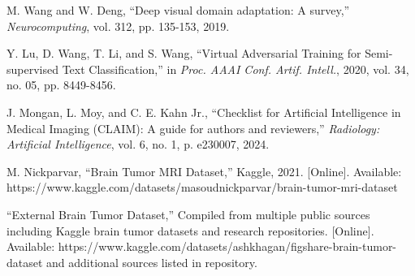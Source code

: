 \documentclass[conference]{IEEEtran}
\begin{document}
\begin{thebibliography}{1}
M. Wang and W. Deng, ``Deep visual domain adaptation: A survey,'' \textit{Neurocomputing}, vol. 312, pp. 135-153, 2019.

Y. Lu, D. Wang, T. Li, and S. Wang, ``Virtual Adversarial Training for Semi-supervised Text Classification,'' in \textit{Proc. AAAI Conf. Artif. Intell.}, 2020, vol. 34, no. 05, pp. 8449-8456.

J. Mongan, L. Moy, and C. E. Kahn Jr., ``Checklist for Artificial Intelligence in Medical Imaging (CLAIM): A guide for authors and reviewers,'' \textit{Radiology: Artificial Intelligence}, vol. 6, no. 1, p. e230007, 2024.

M. Nickparvar, ``Brain Tumor MRI Dataset,'' Kaggle, 2021. [Online]. Available: https://www.kaggle.com/datasets/masoudnickparvar/brain-tumor-mri-dataset

``External Brain Tumor Dataset,'' Compiled from multiple public sources including Kaggle brain tumor datasets and research repositories. [Online]. Available: https://www.kaggle.com/datasets/ashkhagan/figshare-brain-tumor-dataset and additional sources listed in repository.

\end{thebibliography}
\end{document}
